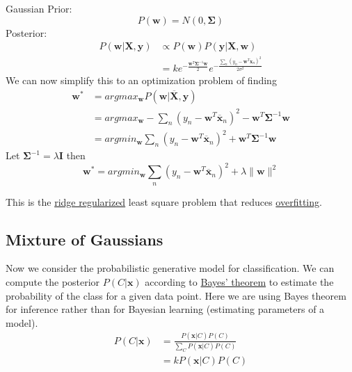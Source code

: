 \documentclass[12pt]{article}
\begin{document}
            Gaussian Prior:
            $$ P(\boldsymbol{w}) = N(0, \boldsymbol{\Sigma}) $$ Posterior:
            \begin{align*}
                P(\boldsymbol{w} | \boldsymbol{X}, \boldsymbol{y}) &\propto P(\boldsymbol{w})P(\boldsymbol{y}|\boldsymbol{X}, \boldsymbol{w}) \\
                &= ke^{-\frac{\boldsymbol{w}^T\boldsymbol{\Sigma}^{-1}\boldsymbol{w}}{2}} e^{-\frac{\sum_n(y_n - \boldsymbol{w}^T\boldsymbol{x}_n)^2}{2\sigma^2}}
            \end{align*}
            We can now simplify this to an optimization problem of finding
            \begin{align*}
                \boldsymbol{w}^* &= argmax_{\boldsymbol{w}}P(\boldsymbol{w}|\overline{\boldsymbol{X}}, \boldsymbol{y}) \\
                &= argmax_{\boldsymbol{w}} - \sum_{n} (y_n - \boldsymbol{w}^T\overline{\boldsymbol{x}}_n)^2 - \boldsymbol{w}^T \boldsymbol{\Sigma}^{-1}\boldsymbol{w} \\
                &= argmin_{\boldsymbol{w}} \sum_{n} (y_n - \boldsymbol{w}^T \overline{\boldsymbol{x}}_n)^2 + \boldsymbol{w}^T \boldsymbol{\Sigma}^{-1}\boldsymbol{w}
            \end{align*}
            Let $\boldsymbol{\Sigma}^{-1} = \lambda \boldsymbol{I}$ then
            $$ \boldsymbol{w}^* = argmin_{\boldsymbol{w}} \sum_{n} (y_n - \boldsymbol{w}^T
            \overline{\boldsymbol{x}}_n)^2 + \lambda \|\boldsymbol{w}\|^2 $$

            This is the \hyperref[sec:RidgeReg]{ridge regularized} least square problem that reduces
            \hyperref[sec:Overfitting]{overfitting}.

    \subsection{Mixture of Gaussians}
        Now we consider the probabilistic generative model \label{fact:GenerativeModel} for classification. We can
        compute the posterior $P(C|\boldsymbol{x})$ according to \hyperref[fact:Bayes]{Bayes' theorem} to estimate the
        probability of the class for a given data point. Here we are using Bayes theorem for inference rather than for
        Bayesian learning (estimating parameters of a model).
        \begin{align*}
            P(C|\boldsymbol{x}) &= \frac{P(\boldsymbol{x}|C)P(C)}{\sum_C P(\boldsymbol{x}|C)P(C)} \\
            &= k P(\boldsymbol{x}|C)P(C)
        \end{align*}
\end{document}

